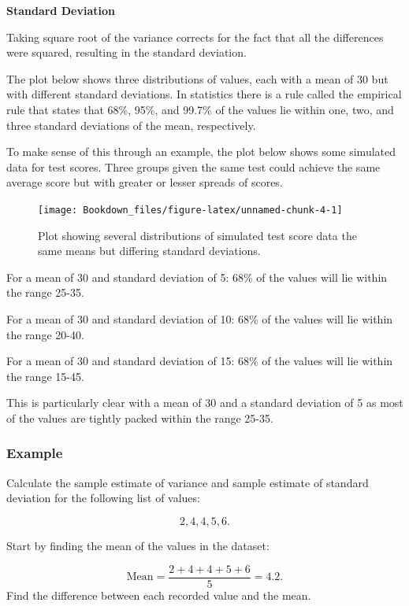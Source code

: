 \documentclass[
]{book}
\begin{document}
\textbf{Standard Deviation}

Taking square root of the variance corrects for the fact that all the differences were squared, resulting in the standard deviation.

The plot below shows three distributions of values, each with a mean of 30 but with different standard deviations. In statistics there is a rule called the empirical rule that states that 68\%, 95\%, and 99.7\% of the values lie within one, two, and three standard deviations of the mean, respectively.

To make sense of this through an example, the plot below shows some simulated data for test scores. Three groups given the same test could achieve the same average score but with greater or lesser spreads of scores.

\begin{figure}

{\centering \texttt{[image: Bookdown\_files/figure-latex/unnamed-chunk-4-1]} 

}

\caption{Plot showing several distributions of simulated test score data the same means but differing standard deviations.}\label{fig:unnamed-chunk-4}
\end{figure}

For a mean of 30 and standard deviation of 5: 68\% of the values will lie within the range 25-35.

For a mean of 30 and standard deviation of 10: 68\% of the values will lie within the range 20-40.

For a mean of 30 and standard deviation of 15: 68\% of the values will lie within the range 15-45.

This is particularly clear with a mean of 30 and a standard deviation of 5 as most of the values are tightly packed within the range 25-35.

\hypertarget{example-9}{%
\subsubsection{Example}\label{example-9}}

Calculate the sample estimate of variance and sample estimate of standard deviation for the following list of values:

\[ 2, 4, 4, 5, 6.\]

Start by finding the mean of the values in the dataset:

\[ \textrm{Mean}= \frac{2 + 4 + 4 + 5 + 6}{5}=4.2.\]
Find the difference between each recorded value and the mean.
\end{document}
